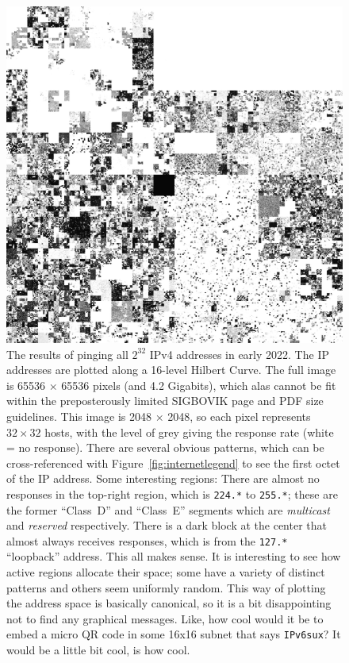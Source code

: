 \documentclass[twocolumn]{article}
\begin{document}
\begin{figure}[tp]
\includegraphics[width=\textwidth]{internet}
\caption{ The results of pinging all $2^{32}$ IPv4 addresses in early
  2022. The IP addresses are plotted along a 16-level Hilbert
  Curve\cite{hilbert1891ueber}. The full image is 65536 $\times$ 65536
  pixels (and 4.2 Gigabits), which alas cannot be fit within the
  preposterously limited SIGBOVIK page and PDF size guidelines. This
  image is 2048 $\times$ 2048, so each pixel represents $32 \times 32$
  hosts, with the level of grey giving the response rate (white = no
  response). There are several obvious patterns, which can be
  cross-referenced with Figure~\ref{fig:internetlegend} to see the
  first octet of the IP address. Some interesting regions: There are
  almost no responses in the top-right region, which is {\tt 224.*} to
  {\tt 255.*}; these are the former ``Class~D'' and ``Class~E''
  segments which are {\it multicast} and {\it reserved} respectively.
  There is a dark block at the center that almost always receives
  responses, which is from the {\tt 127.*} ``loopback'' address. This
  all makes sense. It is interesting to see how active regions allocate
  their space; some have a variety of distinct patterns and others
  seem uniformly random.
%
  This way of plotting the address space is basically canonical, so it
  is a bit disappointing not to find any graphical messages. Like,
  how cool would it be to embed a micro QR code in some 16x16 subnet
  that says {\tt IPv6sux}? It would be a little bit cool, is how cool.
} \label{fig:internet}
\end{figure}
\end{document}
